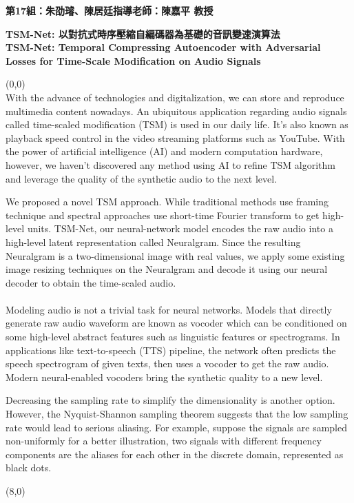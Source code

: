 \documentclass{article}
\begin{document}
\thispagestyle{empty}
\membersize \textbf{第17組：朱劭璿、陳居廷}\hspace{20.5cm}\textbf{指導老師：陳嘉平 教授}
\bigskip

\titlesize \textbf{TSM-Net: 以對抗式時序壓縮自編碼器為基礎的音訊變速演算法 \\
TSM-Net: Temporal Compressing Autoencoder with Adversarial Losses for Time-Scale Modification on Audio Signals}

\begin{textblock}{7.0}(0,0)
 \\
\Large
With the advance of technologies and digitalization, we can store and reproduce multimedia content nowadays. An ubiquitous application regarding audio signals called time-scaled modification (TSM) is used in our daily life. It's also known as playback speed control in the video streaming platforms such as YouTube. With the power of artificial intelligence (AI) and modern computation hardware, however, we haven't discovered any method using AI to refine TSM algorithm and leverage the quality of the synthetic audio to the next level.

We proposed a novel TSM approach. While traditional methods use framing technique and spectral approaches use short-time Fourier transform to get high-level units. TSM-Net, our neural-network model encodes the raw audio into a high-level latent representation called Neuralgram. Since the resulting Neuralgram is a two-dimensional image with real values, we apply some existing image resizing techniques on the Neuralgram and decode it using our neural decoder to obtain the time-scaled audio. \\

\medskip
{} \\
\Large
 Modeling audio is not a trivial task for neural networks. Models that directly generate raw audio waveform are known as vocoder which can be conditioned on some high-level abstract features such as linguistic features or spectrograms. In applications like text-to-speech (TTS) pipeline, the network often predicts the speech spectrogram of given texts, then uses a vocoder to get the raw audio. Modern neural-enabled vocoders bring the synthetic quality to a new level.

Decreasing the sampling rate to simplify the dimensionality is another option. However, the Nyquist-Shannon sampling theorem suggests that the low sampling rate would lead to serious aliasing. For example, suppose the signals are sampled non-uniformly for a better illustration, two signals with different frequency components are the aliases for each other in the discrete domain, represented as black dots.

\large 
\end{textblock}

\begin{textblock}{7.0}(8,0)
 \\
\Large \lipsum[3-3]
\large 

\medskip

 \\
\Large \lipsum[4-4]

\medskip
{} \\
\Large \lipsum[5-5]
\end{textblock}
\end{document}
